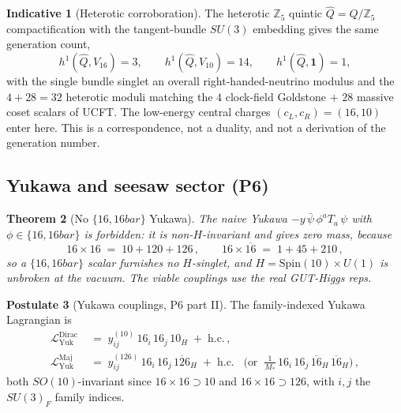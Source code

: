 \documentclass[11pt]{article}
\theoremstyle{plain}
\newtheorem{theorem}{Theorem}[section]
\theoremstyle{definition}
\newtheorem{postulate}[theorem]{Postulate}
\newtheorem{indicative}[theorem]{Indicative}
\theoremstyle{remark}
\begin{document}
\begin{indicative}[Heterotic corroboration]\label{ind:sm:heterotic}
The heterotic $\mathbb{Z}_5$ quintic $\hat Q=Q/\mathbb{Z}_5$ compactification with the
tangent-bundle $SU(3)$ embedding gives the same generation count,
\begin{equation}\label{eq:sm:het}
h^1(\hat Q,V_{16})=3,\qquad h^1(\hat Q,V_{10})=14,\qquad h^1(\hat Q,\mathbf{1})=1,
\end{equation}
with the single bundle singlet an overall right-handed-neutrino modulus and the
$4+28=32$ heterotic moduli matching the $4$ clock-field Goldstone $+$ $28$ massive
coset scalars of UCFT. The low-energy central charges $(c_L,c_R)=(16,10)$ enter here.
This is a correspondence, not a duality, and not a derivation of the generation number.
\end{indicative}

\subsection{Yukawa and seesaw sector (P6)}
\label{sec:sm:yukawa}

\begin{theorem}[No $\{16,16bar\}$ Yukawa]\label{thm:sm:noyukawa}
The naive Yukawa $-y\,\bar\psi\,\phi^a T_a\,\psi$ with $\phi\in\{16,16bar\}$ is
forbidden: it is non-$H$-invariant and gives zero mass, because
\begin{equation}\label{eq:sm:tensor}
16\times 16 \;=\; 10+120+126\,,
\qquad
16\times \overline{16} \;=\; 1+45+210\,,
\end{equation}
so a $\{16,16bar\}$ scalar furnishes no $H$-singlet, and $H=\mathrm{Spin}(10)\times
U(1)$ is unbroken at the vacuum. The viable couplings use the real GUT-Higgs reps.
\end{theorem}

\begin{postulate}[Yukawa couplings, P6 part II]\label{post:sm:P6yukawa}
The family-indexed Yukawa Lagrangian is
\begin{align}
\mathcal{L}^{\mathrm{Dirac}}_{\mathrm{Yuk}}
 &\;=\; y^{(10)}_{ij}\,16_i\,16_j\,10_H \;+\; \mathrm{h.c.}\,,
 \label{eq:sm:Ldirac}\\
\mathcal{L}^{\mathrm{Maj}}_{\mathrm{Yuk}}
 &\;=\; y^{(126)}_{ij}\,16_i\,16_j\,\overline{126}_H \;+\; \mathrm{h.c.}
 \;\;\;\Big(\text{or}\;\; \tfrac{1}{M_*}\,16_i\,16_j\,\overline{16}_H\,\overline{16}_H\Big)\,,
 \label{eq:sm:Lmaj}
\end{align}
both $SO(10)$-invariant since $16\times 16\supset 10$ and $16\times 16\supset 126$,
with $i,j$ the $SU(3)_F$ family indices.
\end{postulate}
\end{document}
